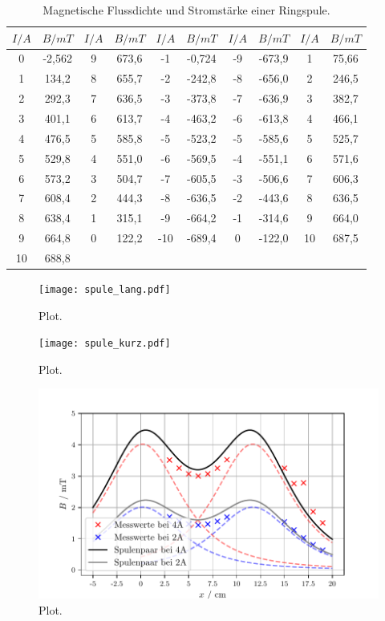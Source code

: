 \begin{table}[H]
  \centering
  \caption{Magnetische Flussdichte und Stromstärke einer Ringspule.}
  \begin{tabular}{c c | c c | c c | c c | c c}
    \toprule
     $I/A$ & $B/mT$ &$I/A$ & $B/mT$ & $I/A$ & $B/mT$ &$I/A$ & $B/mT$ & $I/A$ & $B/mT$  \\
    \midrule
    0 &-2,562 & 9 & 673,6 & -1 & -0,724 & -9 & -673,9 & 1 & 75,66\\
    1 & 134,2 & 8 & 655,7 & -2 & -242,8 & -8 & -656,0 & 2 & 246,5\\
    2 & 292,3 & 7 & 636,5 & -3 & -373,8 & -7 & -636,9 & 3 & 382,7\\
    3 & 401,1 & 6 & 613,7 & -4 & -463,2 & -6 & -613,8 & 4 & 466,1\\
    4 & 476,5 & 5 & 585,8 & -5 & -523,2 & -5 & -585,6 & 5 & 525,7\\
    5 & 529,8 & 4 & 551,0 & -6 & -569,5 & -4 & -551,1 & 6 & 571,6\\
    6 & 573,2 & 3 & 504,7 & -7 & -605,5 & -3 & -506,6 & 7 & 606,3\\
    7 & 608,4 & 2 & 444,3 & -8 & -636,5 & -2 & -443,6 & 8 & 636,5\\
    8 & 638,4 & 1 & 315,1 & -9 & -664,2 & -1 & -314,6 & 9 & 664,0\\
    9 & 664,8 & 0 & 122,2 & -10 & -689,4 & 0 & -122,0 & 10 & 687,5\\
    10 & 688,8 \\
   
    
  \bottomrule
  \end{tabular}
\end{table}


\begin{figure}
  \centering
  \texttt{[image: spule\_lang.pdf]}
  \caption{Plot.}
  \label{fig:plot}
\end{figure}

\begin{figure}
  \centering
  \texttt{[image: spule\_kurz.pdf]}
  \caption{Plot.}
  \label{fig:plot}
\end{figure}

\begin{figure}
  \centering
  \includegraphics{helmholtzD.pdf}
  \caption{Plot.}
  \label{fig:plot}
\end{figure}

